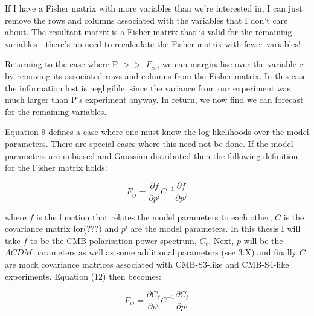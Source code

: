 If I have a Fisher matrix with more variables than we're interested in, I can just remove the rows and columns associated with the variables that I don't care about. The resultant matrix is a Fisher matrix that is valid for the remaining variables - there's no need to recalculate the Fisher matrix with fewer variables!

Returning to the case where P $>>$ $F_{cc}$, we can marginalise over the variable c by removing its associated rows and columns from the Fisher matrix. In this case the information lost is negligible, since the variance from our experiment was much larger than P's experiment anyway. In return, we now find we can forecast for the remaining variables.

Equation 9 defines a case where one must know the log-likelihoods over the model parameters. There are special cases where this need not be done. If the model parameters are unbiased and Gaussian distributed then the following definition for the Fisher matrix holds:

\begin{equation}
F_{ij} = \frac{\partial f}{\partial p^i} C^{-1} \frac{\partial f}{\partial p^j}
\end{equation}

where $f$ is the function that relates the model parameters to each other, $C$ is the covariance matrix for(???) and $p^{i}$ are the model parameters. In this thesis I will take $f$ to be the CMB polarisation power spectrum, $C_{\ell}$. Next, ${p}$ will be the $\Lambda CDM$ parameters as well as some additional parameters (see 3.X) and finally $C$ are mock covariance matrices associated with CMB-S3-like and CMB-S4-like experiments. Equation (12) then becomes:

\begin{equation}
F_{ij} = \frac{\partial C_{\ell}}{\partial p^i} C^{-1} \frac{\partial C_{\ell}}{\partial p^j}
\end{equation}

